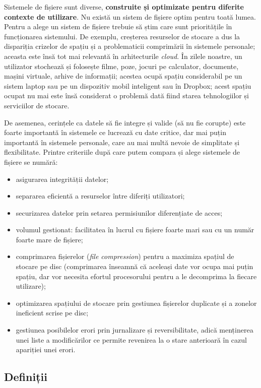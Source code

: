 Sistemele de fișiere sunt diverse, \textbf{construite și optimizate pentru diferite contexte de utilizare}.
Nu există un sistem de fișiere optim pentru toată lumea.
Pentru a alege un sistem de fișiere trebuie să știm care sunt prioritățile în funcționarea sistemului.
De exemplu, creșterea resurselor de stocare a dus la dispariția crizelor de spațiu și a problematicii comprimării în sistemele personale;
aceasta este însă tot mai relevantă în arhitecturile \textit{cloud}.
În zilele noastre, un utilizator stochează și folosește filme, poze, jocuri pe calculator, documente, mașini virtuale, arhive de informații;
acestea ocupă spațiu considerabil pe un sistem laptop sau pe un dispozitiv mobil inteligent sau în Dropbox;
acest spațiu ocupat nu mai este însă considerat o problemă dată fiind starea tehnologiilor și serviciilor de stocare.

De asemenea, cerințele ca datele să fie integre și valide (să nu fie corupte) este foarte importantă în sistemele ce lucrează cu date critice, dar mai puțin importantă în sistemele personale, care au mai multă nevoie de simplitate și flexibilitate.
Printre criteriile după care putem compara și alege sistemele de fișiere se numără:

\begin{itemize}
  \item asigurarea integrității datelor;
  \item separarea eficientă a resurselor între diferiți utilizatori;
  \item securizarea datelor prin setarea permisiunilor diferențiate de acces;
  \item volumul gestionat: facilitatea în lucrul cu fișiere foarte mari sau cu un număr foarte mare de fișiere;
  \item comprimarea fișierelor (\textit{file compression}) pentru a maximiza spațiul de stocare pe disc (comprimarea înseamnă că aceleași date vor ocupa mai puțin spațiu, dar vor necesita efortul procesorului pentru a le decomprima la fiecare utilizare);
  \item optimizarea spațiului de stocare prin gestiunea fișierelor duplicate și a zonelor ineficient scrise pe disc;
  \item gestiunea posibilelor erori prin jurnalizare și reversibilitate, adică menținerea unei liste a modificărilor ce permite revenirea la o stare anterioară în cazul apariției unei erori.
\end{itemize}

\subsection{Definiții}
\label{sec:fs:defs}


